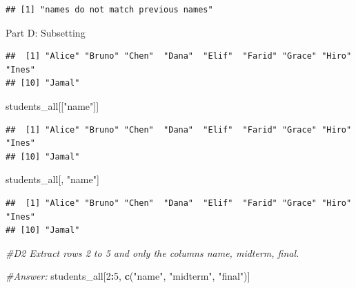 \documentclass[
]{article}
\newenvironment{Shaded}{\begin{snugshade}}{\end{snugshade}}
\newcommand{\CommentTok}[1]{\textcolor[rgb]{0.56,0.35,0.01}{\textit{#1}}}
\newcommand{\DecValTok}[1]{\textcolor[rgb]{0.00,0.00,0.81}{#1}}
\newcommand{\FunctionTok}[1]{\textcolor[rgb]{0.13,0.29,0.53}{\textbf{#1}}}
\newcommand{\NormalTok}[1]{#1}
\newcommand{\SpecialCharTok}[1]{\textcolor[rgb]{0.81,0.36,0.00}{\textbf{#1}}}
\newcommand{\StringTok}[1]{\textcolor[rgb]{0.31,0.60,0.02}{#1}}
\begin{document}
\begin{verbatim}
## [1] "names do not match previous names"
\end{verbatim}

Part D: Subsetting

\begin{Shaded}
\end{Shaded}

\begin{verbatim}
##  [1] "Alice" "Bruno" "Chen"  "Dana"  "Elif"  "Farid" "Grace" "Hiro"  "Ines" 
## [10] "Jamal"
\end{verbatim}

\begin{Shaded}
\begin{Highlighting}[]
\NormalTok{students\_all[[}\StringTok{"name"}\NormalTok{]]}
\end{Highlighting}
\end{Shaded}

\begin{verbatim}
##  [1] "Alice" "Bruno" "Chen"  "Dana"  "Elif"  "Farid" "Grace" "Hiro"  "Ines" 
## [10] "Jamal"
\end{verbatim}

\begin{Shaded}
\begin{Highlighting}[]
\NormalTok{students\_all[, }\StringTok{"name"}\NormalTok{]}
\end{Highlighting}
\end{Shaded}

\begin{verbatim}
##  [1] "Alice" "Bruno" "Chen"  "Dana"  "Elif"  "Farid" "Grace" "Hiro"  "Ines" 
## [10] "Jamal"
\end{verbatim}

\begin{Shaded}
\begin{Highlighting}[]
\CommentTok{\#D2 Extract rows 2 to 5 and only the columns name, midterm, final.}

\CommentTok{\#Answer:}
\NormalTok{students\_all[}\DecValTok{2}\SpecialCharTok{:}\DecValTok{5}\NormalTok{, }\FunctionTok{c}\NormalTok{(}\StringTok{"name"}\NormalTok{, }\StringTok{"midterm"}\NormalTok{, }\StringTok{"final"}\NormalTok{)]}
\end{Highlighting}
\end{Shaded}
\end{document}
